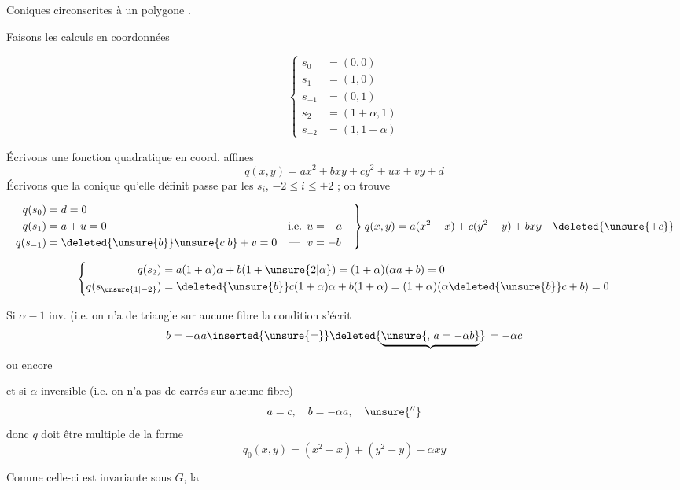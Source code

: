 Coniques circonscrites à un polygone .

Faisons les calculs en coordonnées 

\[
\left\{\begin{aligned}
s_0&=(0,0)\\
s_1&=(1,0)\\
s_{-1}&=(0,1)\\
s_2&=(1+\alpha,1)\\
s_{-2}&=(1,1+\alpha)
\end{aligned}\right. \tag*{(1)}
\]

Écrivons une fonction quadratique  en coord. affines
\[
q(x,y)=ax^2+bxy+cy^2+ux+vy+d
\]
 Écrivons que  la conique qu'elle définit
passe par les  $s_i$, $-2\le i\le +2$ ; on trouve

\[
\left.\begin{aligned}
q(s_0)&=d=0\\
q(s_1)&=a+u=0&\text{i.e. }u&=-a\\
q(s_{-1})&=\deleted{\unsure{b}}\unsure{c|b}+v=0&\text{--- }\ v&=-b
\end{aligned}\right\}
q(x,y)=a(x^2-x)+c(y^2-y)+bxy\quad\deleted{\unsure{+c}}
\]

\[
\left\{\begin{aligned}
q(s_2)&=a(1+\alpha)\alpha+b(1+\unsure{2|\alpha})=(1+\alpha)(\alpha a+b)=0\\
q(s_{\unsure{1|-2}})&=\deleted{\unsure{b}}c(1+\alpha)\alpha+b(1+\alpha)=(1+\alpha)(\alpha\deleted{\unsure{b}}c+b)=0
\end{aligned}\right.
\]

Si $\alpha-1$ inv. (i.e. on n'a de triangle sur aucune fibre
la condition s'écrit
\[
 b=-\alpha a\inserted{\unsure{=}}\deleted{\underbrace{\unsure{,\,a=-\alpha b}}}\,=-\alpha c
\]
ou encore

et si $\alpha$ inversible (i.e. on n'a pas de carrés sur aucune fibre)
\[
 a=c,\quad b=-\alpha a,\quad \unsure{''}
\]
donc $q$ doit être multiple  de la forme
\[
q_0(x,y)=(x^2-x)+(y^2-y)-\alpha xy \tag*{(2)}
\]

Comme celle-ci est invariante sous $G$, la


